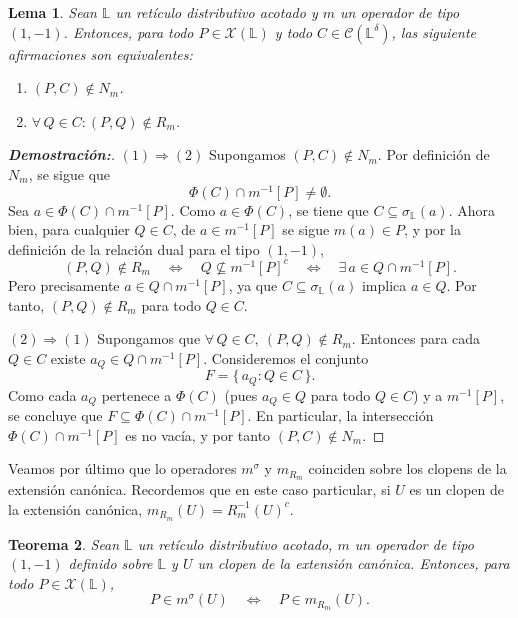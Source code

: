 \documentclass[12pt]{book}
\newtheorem{theorem}{Teorema}[section]
\newtheorem{lemma}[theorem]{Lema}
\begin{document}
\begin{lemma}\label{lem:N-R-1-1}
Sean $\mathbb{L}$ un retículo distributivo acotado y \(m\) un operador de tipo \((1,-1)\). Entonces, para todo \(P\in\mathcal X(\mathbb L)\) y todo \(C\in\mathcal C(\mathbb L^\delta)\), las siguiente afirmaciones son equivalentes:
\begin{enumerate}
    \item $(P,C)\notin N_m$.
    \item $\forall\, Q\in C: (P,Q)\notin R_m$.
\end{enumerate}
\end{lemma}

\begin{proof}[\textbf{Demostración:}]

$(1)\Rightarrow(2)$ Supongamos $(P,C)\notin N_m$. Por definición de $N_m$, se sigue que 
\[ \Phi(C)\cap m^{-1}[P]\neq\emptyset. \]
Sea $a\in \Phi(C)\cap m^{-1}[P]$. Como $a\in \Phi(C)$, se tiene que $C\subseteq\sigma_{\mathbb L}(a)$.
Ahora bien, para cualquier $Q\in C$, de $a\in m^{-1}[P]$ se sigue $m(a)\in P$,
y por la definición de la relación dual para el tipo $(1,-1)$,
\[
(P,Q)\notin R_m
\quad\Longleftrightarrow\quad
Q\not\subseteq m^{-1}[P]^c
\quad\Longleftrightarrow\quad
\exists\,a\in Q\cap m^{-1}[P].
\]
Pero precisamente $a\in Q\cap m^{-1}[P]$, ya que
$C\subseteq\sigma_{\mathbb L}(a)$ implica $a\in Q$.
Por tanto, $(P,Q)\notin R_m$ para todo $Q\in C$.\\

\vspace{0.2cm}

$(2)\Rightarrow(1)$ Supongamos que $\forall\,Q\in C,\ (P,Q)\notin R_m$.
Entonces para cada $Q\in C$ existe $a_Q\in Q\cap m^{-1}[P]$.
Consideremos el conjunto
\[
F=\{\,a_Q : Q\in C\,\}.
\]
Como cada $a_Q$ pertenece a $\Phi(C)$ (pues $a_Q\in Q$ para todo $Q\in C$)
y a $m^{-1}[P]$, se concluye que
$F\subseteq \Phi(C)\cap m^{-1}[P]$.
En particular, la intersección $\Phi(C)\cap m^{-1}[P]$ es no vacía,
y por tanto $(P,C)\notin N_m$.
\end{proof}
Veamos por último que lo operadores $m^\sigma$ y $m_{R_m}$ coinciden sobre los clopens de la extensión canónica. Recordemos que en este caso particular, si $U$ es un clopen de la extensión canónica, $m_{R_m}(U)=R_m^{-1}(U)^c$.
\begin{theorem} \label{teo:igualdad-operadores1-1}
Sean $\mathbb{L}$ un retículo distributivo acotado, $m$ un operador de tipo $(1,-1)$ definido sobre $\mathbb{L}$ y $U$ un clopen de la extensión canónica. Entonces, para todo
$P\in\mathcal X(\mathbb L)$,
\[
P\in m^\sigma(U)
\quad\Longleftrightarrow\quad
P\in m_{R_m}(U).
\]
\end{theorem}
\end{document}
